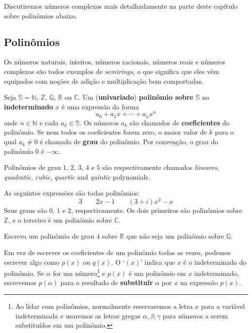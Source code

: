 Discutiremos números complexos mais detalhadamente na parte deste capítulo sobre polinômios abaixo.

\subsection*{Polinômios}
\label{pGettingStartedPolynomials}

Os números naturais, inteiros, números racionais, números reais e números complexos são todos exemplos de \textit{semirings}, o que significa que eles vêm equipados com noções de adição e multiplicação bem comportadas.

\begin{definition}
\label{defPolynomialPreliminary}
Seja $\mathbb{S} = \mathbb{N}$, $\mathbb{Z}$, $\mathbb{Q}$, $\mathbb{R}$ ou $\mathbb{C}$. Um (\textbf{univariado}) \textbf{polinômio sobre $\mathbb{S}$} no \textbf{indeterminado} $x$ é uma expressão da forma
\[ a_0 + a_1x + \cdots + a_nx^n \]
onde $n \in \mathbb{N}$ e cada $a_k \in \mathbb{S}$. Os números $a_k$ são chamados de \textbf{coeficientes} do polinômio. Se nem todos os coeficientes forem zero, o maior valor de $k$ para o qual $a_k \ne 0$ é chamado de \textbf{grau} do polinômio. Por convenção, o grau do polinômio $0$ é $-\infty$.
\end{definition}

Polinômios de grau $1$, $2$, $3$, $4$ e $5$ são respectivamente chamados \textit{lineares}, \textit{quadratic}, \textit{cubic}, \textit{quartic} and \textit{quintic} polynomials.

\begin{example}
As seguintes expressões são todas polinômios:
\[ 3 \qquad 2x-1 \qquad (3+i)x^2-x \]
Seus graus são $0$, $1$ e $2$, respectivamente. Os dois primeiros são polinômios sobre $\mathbb{Z}$, e o terceiro é um polinômio sobre $\mathbb{C}$.
\end{example}

\begin{exercise}
Escreva um polinômio de grau $4$ sobre $\mathbb{R}$ que não seja um polinômio sobre $\mathbb{Q}$.
\end{exercise}

\begin{notation}
Em vez de escrever os coeficientes de um polinômio todas as vezes, podemos escrever algo como $p(x)$ ou $q(x)$. O `$(x)$' indica que $x$ é o indeterminado do polinômio. Se $\alpha$ for um número\footnote{Ao lidar com polinômios, normalmente reservaremos a letra $x$ para a variável indeterminada e usaremos as letras gregas $\alpha,\beta,\gamma$  para números a serem substituídos em um polinômio.} e $p(x)$ é um polinômio em $x$ indeterminado, escrevemos $p(\alpha)$ para o resultado de \textbf{substituir} $\alpha$ por $x$ na expressão $p(x)$.
\end{notation}

